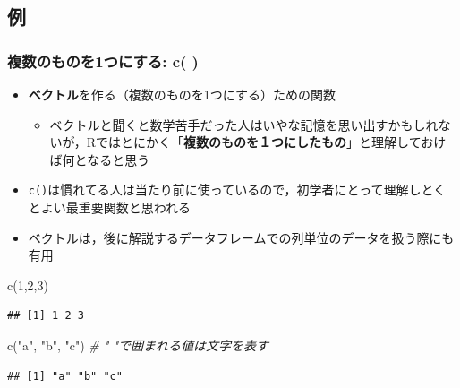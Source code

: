 \documentclass[
  xelatex,ja=standard, b5paper]{bxjsbook}
\newenvironment{Shaded}{\begin{snugshade}}{\end{snugshade}}
\newcommand{\CommentTok}[1]{\textcolor[rgb]{0.56,0.35,0.01}{\textit{#1}}}
\newcommand{\DecValTok}[1]{\textcolor[rgb]{0.00,0.00,0.81}{#1}}
\newcommand{\FunctionTok}[1]{\textcolor[rgb]{0.00,0.00,0.00}{#1}}
\newcommand{\NormalTok}[1]{#1}
\newcommand{\StringTok}[1]{\textcolor[rgb]{0.31,0.60,0.02}{#1}}
\providecommand{\tightlist}{%
  \setlength{\itemsep}{0pt}\setlength{\parskip}{0pt}}
\begin{document}
\hypertarget{p-function-ex}{%
\subsection{例}\label{p-function-ex}}

\hypertarget{p-function-ex-c}{%
\subsubsection{複数のものを1つにする: c( )}\label{p-function-ex-c}}

\begin{itemize}
\tightlist
\item
  \textbf{ベクトル}を作る（複数のものを1つにする）ための関数

  \begin{itemize}
  \tightlist
  \item
    ベクトルと聞くと数学苦手だった人はいやな記憶を思い出すかもしれないが，Rではとにかく「\textbf{複数のものを１つにしたもの}」と理解しておけば何となると思う
  \end{itemize}
\item
  \texttt{c()}は慣れてる人は当たり前に使っているので，初学者にとって理解しとくとよい最重要関数と思われる
\item
  ベクトルは，後に解説するデータフレームでの列単位のデータを扱う際にも有用
\end{itemize}

\begin{Shaded}
\begin{Highlighting}[]
\FunctionTok{c}\NormalTok{(}\DecValTok{1}\NormalTok{,}\DecValTok{2}\NormalTok{,}\DecValTok{3}\NormalTok{)}
\end{Highlighting}
\end{Shaded}

\begin{verbatim}
## [1] 1 2 3
\end{verbatim}

\begin{Shaded}
\begin{Highlighting}[]
\FunctionTok{c}\NormalTok{(}\StringTok{"a"}\NormalTok{, }\StringTok{"b"}\NormalTok{, }\StringTok{"c"}\NormalTok{) }\CommentTok{\# " "で囲まれる値は文字を表す}
\end{Highlighting}
\end{Shaded}

\begin{verbatim}
## [1] "a" "b" "c"
\end{verbatim}
\end{document}
